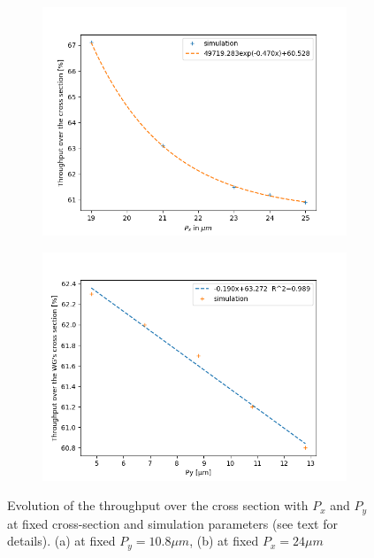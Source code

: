 \begin{figure}[htbp]
  \centering
  \begin{subfigure}[b]{.45\textwidth}
    \centering
    \includegraphics[scale=.4]{picture/geometry/throughput_px.png}
    \subcaption{}
  \end{subfigure}%
  \hspace{.5cm}
  \begin{subfigure}[b]{.45\textwidth}
    \centering
    \includegraphics[scale=.4]{picture/geometry/throughput_py.png}
    \subcaption{}
  \end{subfigure}
  \caption{Evolution of the throughput over the cross section with
    $P_x$ and $P_y$ at fixed cross-section and simulation
    parameters (see text for details). (a) at fixed $P_y=10.8 \mu m$, (b) at fixed $P_x=24 \mu m$}
  \label{fig:throu_pxpy}
\end{figure}

